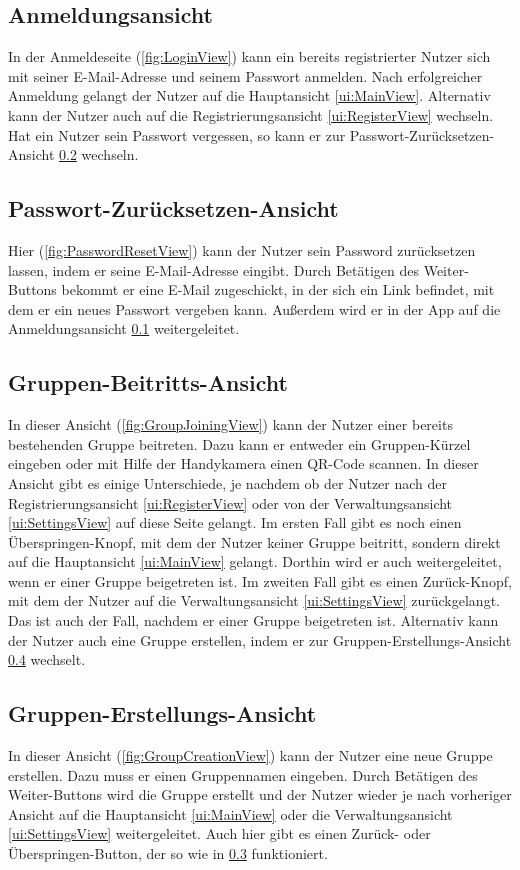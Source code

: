 \documentclass[parskip=full]{scrartcl}
\begin{document}
\subsection{Anmeldungsansicht}
\label{ui:LoginView}
In der Anmeldeseite (\autoref{fig:LoginView}) kann ein bereits registrierter Nutzer sich mit seiner E-Mail-Adresse und seinem Passwort anmelden. Nach erfolgreicher Anmeldung gelangt der Nutzer auf die Hauptansicht \ref{ui:MainView}. Alternativ kann der Nutzer auch auf die Registrierungsansicht \ref{ui:RegisterView} wechseln.
Hat ein Nutzer sein Passwort vergessen, so kann er zur Passwort-Zurücksetzen-Ansicht \ref{ui:PasswordResetView} wechseln.

\subsection{Passwort-Zurücksetzen-Ansicht}
\label{ui:PasswordResetView}
Hier (\autoref{fig:PasswordResetView}) kann der Nutzer sein Password zurücksetzen lassen, indem er seine E-Mail-Adresse eingibt. Durch Betätigen des Weiter-Buttons bekommt er eine E-Mail zugeschickt, in der sich ein Link befindet, mit dem er ein neues Passwort vergeben kann. Außerdem wird er in der App auf die Anmeldungsansicht \ref{ui:LoginView} weitergeleitet.

\subsection{Gruppen-Beitritts-Ansicht}
\label{ui:GroupJoiningView}
In dieser Ansicht (\autoref{fig:GroupJoiningView}) kann der Nutzer einer bereits bestehenden Gruppe beitreten. Dazu kann er entweder ein Gruppen-Kürzel eingeben oder mit Hilfe der Handykamera einen QR-Code scannen. In dieser Ansicht gibt es einige Unterschiede, je nachdem ob der Nutzer nach der Registrierungsansicht \ref{ui:RegisterView} oder von der Verwaltungsansicht \ref{ui:SettingsView} auf diese Seite gelangt. Im ersten Fall gibt es noch einen Überspringen-Knopf, mit dem der Nutzer keiner Gruppe beitritt, sondern direkt auf die Hauptansicht \ref{ui:MainView} gelangt. Dorthin wird er auch weitergeleitet, wenn er einer Gruppe beigetreten ist. Im zweiten Fall gibt es einen Zurück-Knopf, mit dem der Nutzer auf die Verwaltungsansicht \ref{ui:SettingsView} zurückgelangt. Das ist auch der Fall, nachdem er einer Gruppe beigetreten ist.
Alternativ kann der Nutzer auch eine Gruppe erstellen, indem er zur Gruppen-Erstellungs-Ansicht \ref{ui:GroupCreationView} wechselt.

\subsection{Gruppen-Erstellungs-Ansicht}
\label{ui:GroupCreationView}
In dieser Ansicht (\autoref{fig:GroupCreationView}) kann der Nutzer eine neue Gruppe erstellen. Dazu muss er einen Gruppennamen eingeben. Durch Betätigen des Weiter-Buttons wird die Gruppe erstellt und der Nutzer wieder je nach vorheriger Ansicht auf die Hauptansicht \ref{ui:MainView} oder die Verwaltungsansicht \ref{ui:SettingsView} weitergeleitet. Auch hier gibt es einen Zurück- oder Überspringen-Button, der so wie in \ref{ui:GroupJoiningView} funktioniert.
\end{document}
